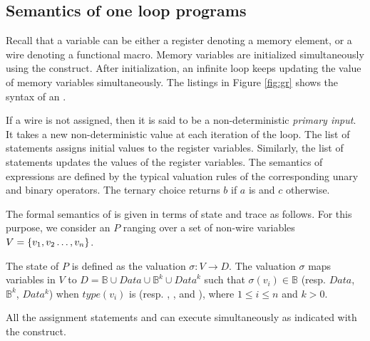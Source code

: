 %
\subsection{Semantics of one loop programs}
%


Recall that a variable can be either a register
denoting a memory element, 
or a wire denoting a functional macro. 
Memory variables are initialized simultaneously using the 
 construct. 
After initialization, an infinite loop keeps updating the 
value of memory variables simultaneously. 
The listings in Figure \ref{fig:gr} shows the syntax of 
an \caig. 



If a wire is not assigned, then it is said to be a 
non-deterministic {\em primary input}. 
It takes a new non-deterministic value at each iteration of 
the loop.
The list of statements  assigns initial values to 
the register variables.
Similarly, the  list of statements updates 
the values of the register variables. 
The semantics of \caig expressions are defined by the typical 
valuation rules of the corresponding unary and binary operators. 
The ternary choice  returns $b$ if $a$ 
is \true and $c$ otherwise. 



The formal semantics of \caig is given in terms of \caig state and trace as follows. 
%
For this purpose, we consider an \caig $P$ ranging over a set of 
non-wire variables $V=\{ v_1,v_2\ldots,v_n \}$.


\begin{definition}
The state of $P$ is defined as 
the valuation 
$\sigma: V \rightarrow D$. 
The valuation $\sigma$ maps variables in 
$V$ to $ D = \mathbb{B} \cup \mathit{Data} \cup \mathbb{B}^k \cup \mathit{Data}^k$ 
such that $\sigma(v_i) \in \mathbb{B}$ (resp. $Data$, $\mathbb{B}^k$, $Data^k$) when $\mathit{type}(v_i)$ is  (resp. , 
, and ), where $1 \le i \le n$ and $k >0$.
\end{definition}



\begin{definition}
All the assignment statements  and 
 can execute
simultaneously as indicated with the  
construct.
\end{definition}



